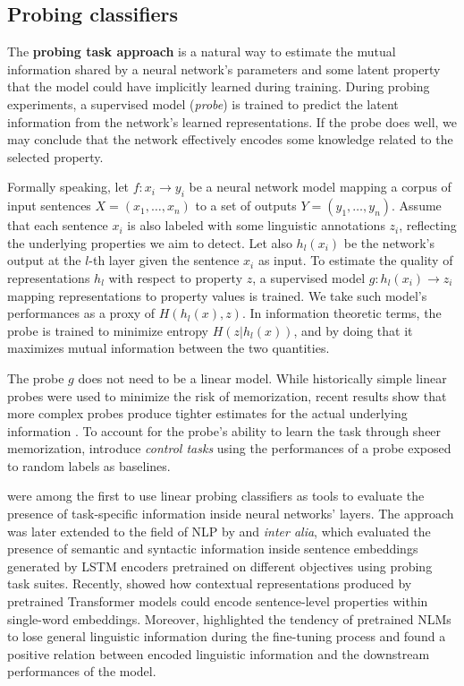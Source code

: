 \documentclass[a4paper, nobind]{templates/ociamthesis}
\begin{document}
\hypertarget{subsubchap:probe}{%
\subsection{Probing classifiers}\label{subsubchap:probe}}

The \textbf{probing task approach} is a natural way to estimate the mutual information shared by a neural network's parameters and some latent property that the model could have implicitly learned during training. During probing experiments, a supervised model (\emph{probe}) is trained to predict the latent information from the network's learned representations. If the probe does well, we may conclude that the network effectively encodes some knowledge related to the selected property.

Formally speaking, let \(f: x_i \rightarrow y_i\) be a neural network model mapping a corpus of input sentences \(X = (x_1, \dots, x_n)\) to a set of outputs \(Y = (y_1, \dots, y_n)\). Assume that each sentence \(x_i\) is also labeled with some linguistic annotations \(z_i\), reflecting the underlying properties we aim to detect. Let also \(h_l(x_i)\) be the network's output at the \(l\)-th layer given the sentence \(x_i\) as input. To estimate the quality of representations \(h_l\) with respect to property \(z\), a supervised model \(g: h_l(x_i) \rightarrow z_i\) mapping representations to property values is trained. We take such model's performances as a proxy of \(H(h_l(x),z)\). In information theoretic terms, the probe is trained to minimize entropy \(H(z|h_l(x))\), and by doing that it maximizes mutual information between the two quantities.

The probe \(g\) does not need to be a linear model. While historically simple linear probes were used to minimize the risk of memorization, recent results show that more complex probes produce tighter estimates for the actual underlying information \autocite{pimentel-etal-2020-information}. To account for the probe's ability to learn the task through sheer memorization, \textcite{hewitt-liang-2019-designing} introduce \emph{control tasks} using the performances of a probe exposed to random labels as baselines.

\textcite{alain-bengio-2016-understanding} were among the first to use linear probing classifiers as tools to evaluate the presence of task-specific information inside neural networks' layers. The approach was later extended to the field of NLP by \textcite{conneau-etal-2018-cram} and \textcite{zhang-bowman-2018-language} \emph{inter alia}, which evaluated the presence of semantic and syntactic information inside sentence embeddings generated by LSTM encoders \autocite{hochreiter-1997-long} pretrained on different objectives using probing task suites. Recently, \textcite{miaschi-dellorletta-2020-contextual} showed how contextual representations produced by pretrained Transformer models could encode sentence-level properties within single-word embeddings. Moreover, \textcite{miaschi-etal-2020-linguistic} highlighted the tendency of pretrained NLMs to lose general linguistic information during the fine-tuning process and found a positive relation between encoded linguistic information and the downstream performances of the model.
\end{document}
